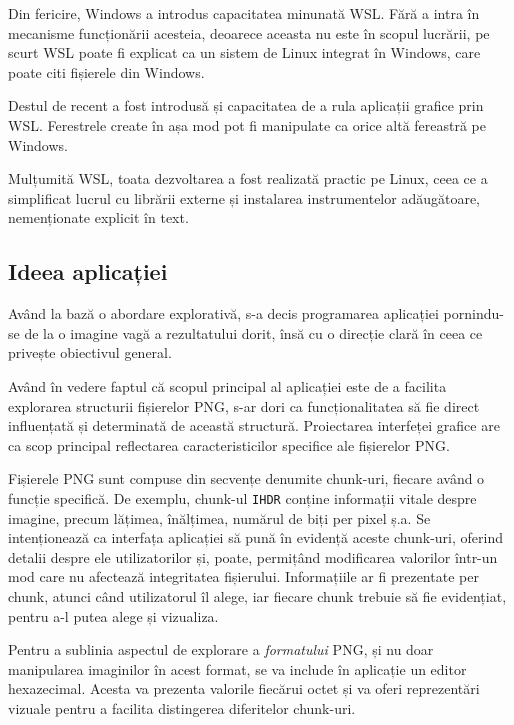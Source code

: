 \documentclass[a4paper,12pt]{report}
\begin{document}
Din fericire, Windows a introdus capacitatea minunată \ac{WSL}\cite{wsl}.
Fără a intra în mecanisme funcționării acesteia, deoarece aceasta nu este în scopul lucrării,
pe scurt \ac{WSL} poate fi explicat ca un sistem de Linux integrat în Windows, care poate citi fișierele din Windows.

Destul de recent a fost introdusă și capacitatea de a rula aplicații grafice prin \ac{WSL}.
Ferestrele create în așa mod pot fi manipulate ca orice altă fereastră pe Windows.

Mulțumită \ac{WSL}, toata dezvoltarea a fost realizată practic pe Linux, 
ceea ce a simplificat lucrul cu librării externe și instalarea instrumentelor adăugătoare, nemenționate explicit în text.

\subsection{Ideea aplicației}

Având la bază o abordare explorativă, s-a decis programarea aplicației
pornindu-se de la o imagine vagă a rezultatului dorit,
însă cu o direcție clară în ceea ce privește obiectivul general.

Având în vedere faptul că scopul principal al aplicației
este de a facilita explorarea structurii fișierelor \ac{PNG},
s-ar dori ca funcționalitatea să fie direct
influențată și determinată de această structură.
Proiectarea interfeței grafice are ca scop principal reflectarea
caracteristicilor specifice ale fișierelor \ac{PNG}.

Fișierele \ac{PNG} sunt compuse din secvențe denumite chunk-uri,
fiecare având o funcție specifică.
De exemplu, chunk-ul \texttt{IHDR} conține informații vitale despre imagine,
precum lățimea, înălțimea, numărul de biți per pixel ș.a.
Se intenționează ca interfața aplicației să pună
în evidență aceste chunk-uri, oferind detalii despre ele utilizatorilor
și, poate, permițând modificarea valorilor într-un mod
care nu afectează integritatea fișierului.
Informațiile ar fi prezentate per chunk, atunci când utilizatorul îl alege,
iar fiecare chunk trebuie să fie evidențiat, pentru a-l putea alege și vizualiza.

Pentru a sublinia aspectul de explorare a \textit{formatului} \ac{PNG},
și nu doar manipularea imaginilor în acest format,
se va include în aplicație un editor hexazecimal.
Acesta va prezenta valorile fiecărui octet și
va oferi reprezentări vizuale pentru a facilita distingerea diferitelor chunk-uri.
\end{document}

